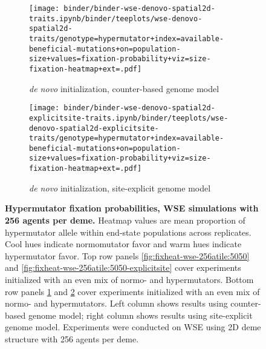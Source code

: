 \begin{figure}[h]
\begin{subfigure}[b]{0.5\linewidth}
    \begin{minipage}{\linewidth}
          \texttt{[image: binder/binder-wse-denovo-spatial2d-traits.ipynb/binder/teeplots/wse-denovo-spatial2d-traits/genotype=hypermutator+index=available-beneficial-mutations+on=population-size+values=fixation-probability+viz=size-fixation-heatmap+ext=.pdf]}%
    \end{minipage}
    \begin{minipage}{\linewidth}
    \caption{\textit{de novo} initialization, counter-based genome model}
    \label{fig:fixheat-wse-256atile:denovo}
    \end{minipage}%
\end{subfigure}%
\begin{subfigure}[b]{0.5\linewidth}
    \begin{minipage}{\linewidth}
          \texttt{[image: binder/binder-wse-denovo-spatial2d-explicitsite-traits.ipynb/binder/teeplots/wse-denovo-spatial2d-explicitsite-traits/genotype=hypermutator+index=available-beneficial-mutations+on=population-size+values=fixation-probability+viz=size-fixation-heatmap+ext=.pdf]}%
    \end{minipage}
    \begin{minipage}{\linewidth}
    \caption{\textit{de novo} initialization, site-explicit genome model}
    \label{fig:fixheat-wse-256atile:denovo-explicitsite}
    \end{minipage}%
\end{subfigure}

  \begin{minipage}{\linewidth}
    \caption{%
\textbf{Hypermutator fixation probabilities, WSE simulations with 256 agents per deme.}
\footnotesize
Heatmap values are mean proportion of hypermutator allele within end-state populations across replicates.
Cool hues indicate normomutator favor and warm hues indicate hypermutator favor.
Top row panels \ref{fig:fixheat-wse-256atile:5050} and \ref{fig:fixheat-wse-256atile:5050-explicitsite} cover experiments initialized with an even mix of normo- and hypermutators.
Bottom row panels \ref{fig:fixheat-wse-256atile:denovo} and \ref{fig:fixheat-wse-256atile:denovo-explicitsite} cover experiments initialized with an even mix of normo- and hypermutators.
Left column shows results using counter-based genome model; right column shows results using site-explicit genome model.
Experiments were conducted on WSE using 2D deme structure with 256 agents per deme.
    }
    \label{fig:fixheat-wse-256atile}
  \end{minipage}
\end{figure}
